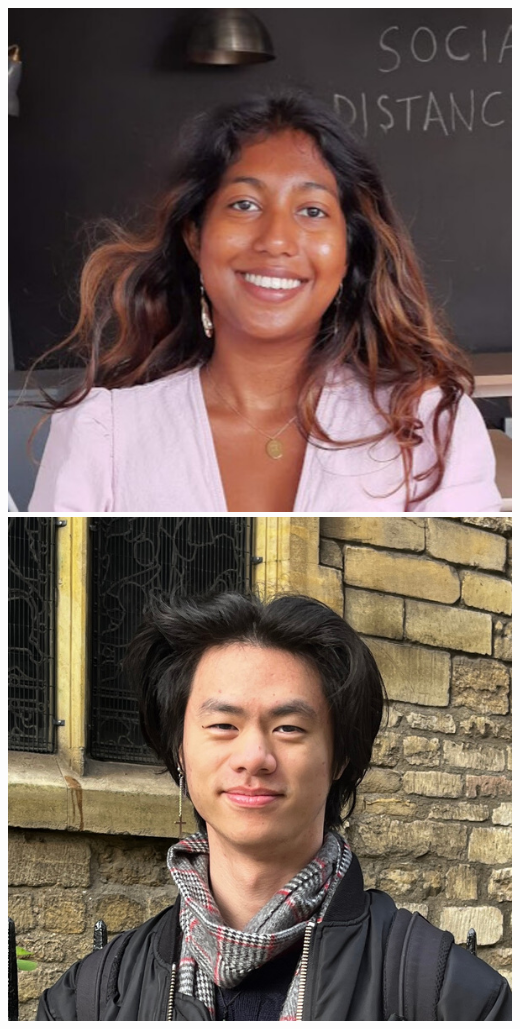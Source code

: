 \documentclass[aspectratio=169]{beamer}
\begin{document}
\begin{frame}
{        \includegraphics[width=0.06\textheight]{people/metha_prathaban.jpg}%
        \includegraphics[width=0.06\textheight]{people/ming_yang.jpg}%
}
\end{frame}
\end{document}
